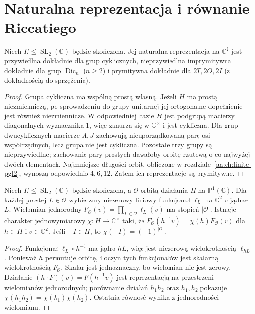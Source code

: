 \section{Naturalna reprezentacja i równanie Riccatiego}

\begin{wniosek}
\label{aa:wn:binary-primitive}
Niech $H\le\operatorname{SL}_2(\mathbb C)$ będzie skończona.
Jej naturalna reprezentacja na $\mathbb C^2$ jest
przywiedlna dokładnie dla grup cyklicznych,
nieprzywiedlna imprymitywna dokładnie dla grup
$\operatorname{Dic}_n$ ($n\ge2$) i prymitywna dokładnie
dla $2T,2O,2I$ (z dokładnością do sprzężenia).
\end{wniosek}
\begin{proof}
Grupa cykliczna ma wspólną prostą własną.
Jeżeli $H$ ma prostą niezmienniczą, po sprowadzeniu
do grupy unitarnej jej ortogonalne dopełnienie jest
również niezmiennicze. W odpowiedniej bazie $H$ jest
podgrupą macierzy diagonalnych wyznacznika $1$,
więc zanurza się w $\mathbb C^\times$ i jest cykliczna.
Dla grup dwucyklicznych macierze $A,J$ zachowują
nieuporządkowaną parę osi współrzędnych, lecz grupa
nie jest cykliczna. Pozostałe trzy grupy są
nieprzywiedlne; zachowanie pary prostych dawałoby
orbitę rzutową o co najwyżej dwóch elementach.
Najmniejsze długości orbit, obliczone w
rozdziale~\ref{aa:ch:finite-pgl2}, wynoszą odpowiednio
$4,6,12$. Zatem ich reprezentacje są prymitywne.
\end{proof}

\begin{stwierdzenie}
\label{aa:st:binary-orbit-form}
Niech $H\le\operatorname{SL}_2(\mathbb C)$ będzie skończona,
a $\mathcal O$ orbitą działania $H$ na
$\mathbb P^1(\mathbb C)$. Dla każdej prostej
$L\in\mathcal O$ wybierzmy niezerowy liniowy funkcjonał
$\ell_L$ na $\mathbb C^2$ o jądrze $L$.
Wielomian jednorodny
$F_{\mathcal O}(v)=\prod_{L\in\mathcal O}\ell_L(v)$
ma stopień $|\mathcal O|$. Istnieje charakter
jednowymiarowy $\chi:H\to\mathbb C^\times$ taki, że
$F_{\mathcal O}(h^{-1}v)=\chi(h)F_{\mathcal O}(v)$
dla $h\in H$ i $v\in\mathbb C^2$.
Jeśli $-I\in H$, to $\chi(-I)=(-1)^{|\mathcal O|}$.
\end{stwierdzenie}
\begin{proof}
Funkcjonał $\ell_L\circ h^{-1}$ ma jądro $hL$,
więc jest niezerową wielokrotnością $\ell_{hL}$.
Ponieważ $h$ permutuje orbitę, iloczyn tych
funkcjonałów jest skalarną wielokrotnością
$F_{\mathcal O}$. Skalar jest jednoznaczny,
bo wielomian nie jest zerowy.
Działanie $(h\cdot F)(v)=F(h^{-1}v)$ jest reprezentacją
na przestrzeni wielomianów jednorodnych;
porównanie działań $h_1h_2$ oraz $h_1,h_2$ pokazuje
$\chi(h_1h_2)=\chi(h_1)\chi(h_2)$.
Ostatnia równość wynika z jednorodności wielomianu.
\end{proof}

